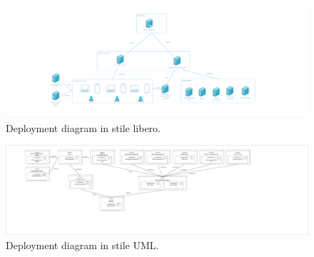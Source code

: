 \begin{landscape}
	\begin{figure}[b]
		\centering
		\includegraphics[width=0.9\linewidth]{./Iterazione 0/OtherFiles/DeploymentDiagramNonFormale}
		\caption{Deployment diagram in stile libero.}
		\label{fig:DeplymnetDiagramNonFormale}
	\end{figure}
\end{landscape}
\begin{landscape}
	\begin{figure}[b]
		\centering
		\includegraphics[width=0.9\linewidth]{./Iterazione 0/OtherFiles/DeplymentDiagramFormale}
		\caption{Deployment diagram in stile UML.}
		\label{fig:DeplymnetDiagramFormale}
	\end{figure}
\end{landscape}
